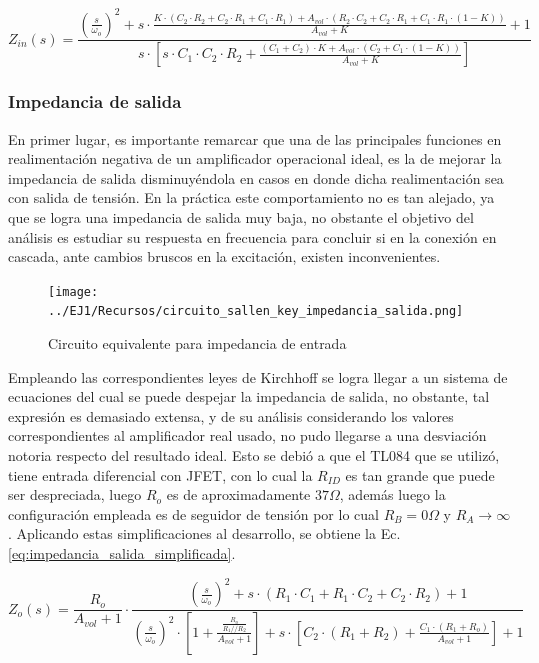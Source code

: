 \begin{equation}
Z_{in}(s) = 
\frac{\left( \frac{s}{\omega_o} \right)^{2} + s \cdot \frac{K \cdot (C_2 \cdot R_2 + C_2 \cdot R_1 + C_1 \cdot R_1) + A_{vol} \cdot (R_2 \cdot C_2 + C_2 \cdot R_1 + C_1 \cdot R_1 \cdot (1 - K))}{A_{vol} + K} + 1}
{s \cdot \left[ s \cdot C_1 \cdot C_2 \cdot R_2 + \frac{(C_1 + C_2) \cdot K + A_{vol} \cdot (C_2 + C_1 \cdot(1 - K))}{A_{vol} + K} \right]}
\end{equation}

\subsubsection{Impedancia de salida}
En primer lugar, es importante remarcar que una de las principales funciones en realimentaci\'on negativa de un amplificador operacional ideal,
es la de mejorar la impedancia de salida disminuy\'endola en casos en donde dicha realimentaci\'on sea con salida de tensi\'on. En la pr\'actica este comportamiento
no es tan alejado, ya que se logra una impedancia de salida muy baja, no obstante el objetivo del an\'alisis es estudiar su respuesta en frecuencia para concluir
si en la conexi\'on en cascada, ante cambios bruscos en la excitaci\'on, existen inconvenientes.

\begin{figure}[H]
	\centering
	\texttt{[image: ../EJ1/Recursos/circuito\_sallen\_key\_impedancia\_salida.png]}
	\caption{Circuito equivalente para impedancia de entrada}
	\label{fig:sallen_key_impedancia_salidas}
\end{figure}

Empleando las correspondientes leyes de Kirchhoff se logra llegar a un sistema de ecuaciones del cual se puede despejar la impedancia de salida, no obstante,
tal expresi\'on es demasiado extensa, y de su an\'alisis considerando los valores correspondientes al amplificador real usado, no pudo llegarse a una desviaci\'on
notoria respecto del resultado ideal. Esto se debi\'o a que el TL084 que se utiliz\'o, tiene entrada diferencial con JFET, con lo cual la $R_{ID}$ es tan grande que puede 
ser despreciada, luego $R_o$ es de aproximadamente $37 \Omega$, adem\'as luego la configuraci\'on empleada es de seguidor de tensi\'on por lo cual $R_B = 0\Omega$ y $R_A \rightarrow \infty$.
Aplicando estas simplificaciones al desarrollo, se obtiene la Ec. \ref{eq:impedancia_salida_simplificada}.

\begin{equation}
Z_o(s) = \frac{R_o}{A_{vol} + 1} \cdot
\frac{\left( \frac{s}{\omega_o} \right)^{2} + s \cdot (R_1 \cdot C_1 + R_1 \cdot C_2 + C_2 \cdot R_2) + 1}
{\left( \frac{s}{\omega_o} \right)^{2} \cdot \left[ 1 + \frac{\frac{R_o}{R_1 // R_2}}{A_{vol} + 1} \right] + s \cdot \left[ C_2 \cdot (R_1 + R_2) + \frac{C_1 \cdot (R_1 + R_o)}{A_{vol} + 1} \right] + 1}
\label{eq:impedancia_salida_simplificada}
\end{equation}

